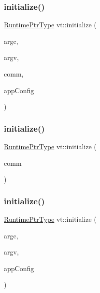 \subsubsection{\texorpdfstring{initialize()}{initialize()}\hspace{0.1cm}{\footnotesize\ttfamily [1/4]}}
{\footnotesize\ttfamily \hyperlink{namespacevt_a0ce60e0299d8fa32223b3b9ffa0af466}{Runtime\+Ptr\+Type} vt\+::initialize (\begin{DoxyParamCaption}\item[{int \&}]{argc,  }\item[{char $\ast$$\ast$\&}]{argv,  }\item[{M\+P\+I\+\_\+\+Comm $\ast$}]{comm,  }\item[{\hyperlink{structvt_1_1arguments_1_1_app_config}{arguments\+::\+App\+Config} const $\ast$}]{app\+Config }\end{DoxyParamCaption})}

\mbox{\label{namespacevt_a9e13ed8a04b3395bbff2f035cae656af}} 
\subsubsection{\texorpdfstring{initialize()}{initialize()}\hspace{0.1cm}{\footnotesize\ttfamily [2/4]}}
{\footnotesize\ttfamily \hyperlink{namespacevt_a0ce60e0299d8fa32223b3b9ffa0af466}{Runtime\+Ptr\+Type} vt\+::initialize (\begin{DoxyParamCaption}\item[{M\+P\+I\+\_\+\+Comm $\ast$}]{comm }\end{DoxyParamCaption})}

\mbox{\label{namespacevt_abc3ee2a9bd23da2ae2ffc703d1779b0b}} 
\subsubsection{\texorpdfstring{initialize()}{initialize()}\hspace{0.1cm}{\footnotesize\ttfamily [3/4]}}
{\footnotesize\ttfamily \hyperlink{namespacevt_a0ce60e0299d8fa32223b3b9ffa0af466}{Runtime\+Ptr\+Type} vt\+::initialize (\begin{DoxyParamCaption}\item[{int \&}]{argc,  }\item[{char $\ast$$\ast$\&}]{argv,  }\item[{\hyperlink{structvt_1_1arguments_1_1_app_config}{arguments\+::\+App\+Config} const $\ast$}]{app\+Config }\end{DoxyParamCaption})}

